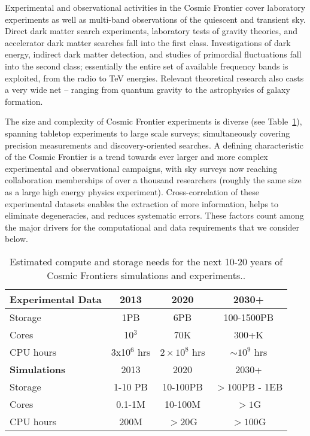 Experimental and observational activities in the Cosmic Frontier cover
laboratory experiments as well as multi-band observations of the
quiescent and transient sky. Direct dark matter search experiments,
laboratory tests of gravity theories, and accelerator dark matter
searches fall into the first class. Investigations of dark energy,
indirect dark matter detection, and studies of primordial fluctuations
fall into the second class; essentially the entire set of available
frequency bands is exploited, from the radio to TeV
energies. Relevant theoretical research also casts a very wide net --
ranging from quantum gravity to the astrophysics of galaxy formation.

The size and complexity of Cosmic Frontier experiments is diverse (see
Table~\ref{tab:CompNeeds}), spanning tabletop experiments to large
scale surveys; simultaneously covering precision measurements and
discovery-oriented searches. A defining characteristic of the Cosmic
Frontier is a trend towards ever larger and more complex experimental
and observational campaigns, with sky surveys now reaching
collaboration memberships of over a thousand researchers (roughly the
same size as a large high energy physics
experiment). Cross-correlation of these experimental datasets enables
the extraction of more information, helps to eliminate degeneracies,
and reduces systematic errors. These factors count among the major
drivers for the computational and data requirements that we consider
below.

\medskip

\begin{table}[h]
\begin{center}
\begin{tabular}{|l|c|c|c|} 
 \hline 
{\bf Experimental Data} & 2013 & 2020 & 2030+ \\
\hline
Storage & 1PB & 6PB & 100-1500PB \\
Cores & 10$^3$ & 70K & 300+K \\
CPU hours & 3x10$^6$ hrs & $2\times 10^8$ hrs & $\sim 10^9$ hrs \\
 \hline 
{\bf Simulations}  & 2013 & 2020 & 2030+ \\
 \hline 
 Storage & 1-10 PB & 10-100PB & $> 100$PB - 1EB\\
Cores & 0.1-1M & 10-100M &$> 1$G\\
CPU hours & 200M & $>$20G & $> 100$G\\
\hline
\end{tabular}
\label{tab:CompNeeds}
\caption{Estimated compute and storage needs for the next 10-20 years
  of Cosmic Frontiers simulations and experiments..}
\end{center}
\end{table}


